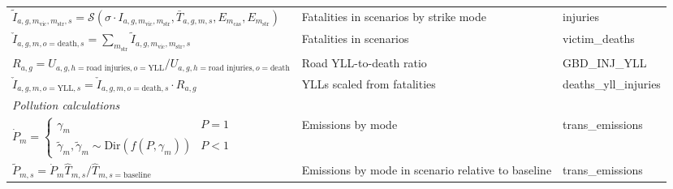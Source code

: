 \documentclass{article}
\begin{document}
\begin{appendix}
\begin{landscape}
\begin{center}
\begin{ThreePartTable}
\begin{longtable}{lp{7cm}p{5cm}}
$\tilde{I}_{a,g,m_{\text{vic}},m_{\text{str}},s}=\mathcal{S}\left(\sigma\cdot {I}_{a,g,m_{\text{vic}},m_{\text{str}}},\bar{T}_{a,g,m,s},E_{m_{\text{cas}}},E_{m_{\text{str}}}\right)$
& Fatalities in scenarios by strike mode & injuries\\[5pt]
$\check{I}_{a,g,m,o=\text{death},s}=\sum_{m_{\text{str}}}\tilde{I}_{a,g,m_{\text{vic}},m_{\text{str}},s}$ & Fatalities in scenarios  & victim\_deaths\\[5pt]

$R_{a,g}=U_{a,g,h=\text{road injuries},o=\text{YLL}}/U_{a,g,h=\text{road injuries},o=\text{death}}$ & Road YLL-to-death ratio & GBD\_INJ\_YLL\\[5pt]

$\check{I}_{a,g,m,o=\text{YLL},s}=\check{I}_{a,g,m,o=\text{death},s}\cdot R_{a,g} $ & YLLs scaled from fatalities & deaths\_yll\_injuries \\[5pt]

\hline
\multicolumn{3}{l}{\textit{Pollution calculations}}\\
\hline
$\dot{P}_{m}=\left\{\begin{array}{lr}\gamma_m & P=1 \\ \tilde{\gamma}_m, \tilde{\gamma}_m \sim \text{Dir}(f(P,\gamma_m)) & P<1 \end{array}\right.$ & Emissions by mode &   trans\_emissions \\[5pt]

$\tilde{P}_{m,s}=\dot{P}_m\hat{T}_{m,s}/\hat{T}_{m,s=\text{baseline}}$& Emissions by mode in scenario relative to baseline &   trans\_emissions \\[5pt]


\end{longtable}
\end{ThreePartTable}
\end{center}
\end{landscape}
\end{appendix}
\end{document}
